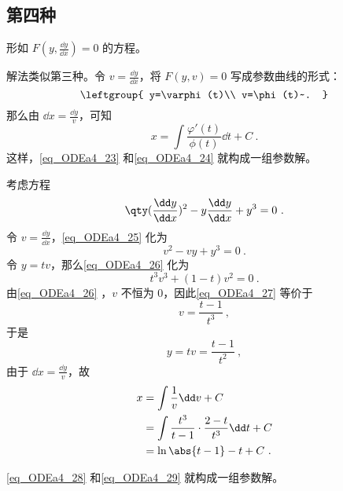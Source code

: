 \subsection{第四种}

形如 $F(y, \frac{\dd y}{\dd x})=0$ 的方程。

解法类似第三种。令 $v=\frac{\dd y}{\dd x}$，将 $F(y, v)=0$ 写成参数曲线的形式：
\begin{equation}\label{eq_ODEa4_23}
\leftgroup{
    y=\varphi(t)\\
    v=\phi(t)~.
}
\end{equation}
那么由 $\dd x=\frac{\dd y}{v}$，可知
\begin{equation}\label{eq_ODEa4_24}
x=\int \frac{\varphi'(t)}{\phi(t)}\dd t+C~.
\end{equation}
这样，\autoref{eq_ODEa4_23} 和\autoref{eq_ODEa4_24} 就构成一组参数解。
\begin{example}{}
考虑方程
\begin{equation}\label{eq_ODEa4_25}
\qty(\frac{\dd y}{\dd x})^2-y\frac{\dd y}{\dd x}+y^3=0~.
\end{equation}
令 $v=\frac{\dd y}{\dd x}$，\autoref{eq_ODEa4_25} 化为
\begin{equation}\label{eq_ODEa4_26}
v^2-vy+y^3=0~.
\end{equation}
令 $y=tv$，那么\autoref{eq_ODEa4_26} 化为
\begin{equation}\label{eq_ODEa4_27}
t^3v^3+(1-t)v^2=0~.
\end{equation}
由\autoref{eq_ODEa4_26} ，$v$ 不恒为 $0$，因此\autoref{eq_ODEa4_27} 等价于
\begin{equation}
v=\frac{t-1}{t^3}~,
\end{equation}
于是
\begin{equation}\label{eq_ODEa4_28}
y=tv=\frac{t-1}{t^2}~,
\end{equation}
由于 $\dd x=\frac{\dd y}{v}$，故
\begin{equation}\label{eq_ODEa4_29}
\begin{aligned}
x
&=\int \frac{1}{v} \dd v+C\\
&=\int \frac{t^3}{t-1}\cdot\frac{2-t}{t^3}\dd t+C\\
&=\ln\abs{t-1}-t+C~.
\end{aligned}
\end{equation}

\autoref{eq_ODEa4_28} 和\autoref{eq_ODEa4_29} 就构成一组参数解。

\end{example}











